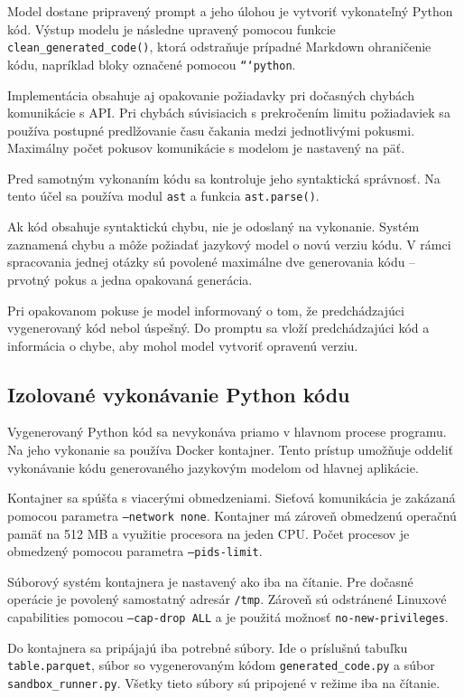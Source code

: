Model dostane pripravený prompt a jeho úlohou je vytvoriť vykonateľný Python
kód. Výstup modelu je následne upravený pomocou funkcie
\texttt{clean\_generated\_code()}, ktorá odstraňuje prípadné Markdown
ohraničenie kódu, napríklad bloky označené pomocou \texttt{```python}.

Implementácia obsahuje aj opakovanie požiadavky pri dočasných chybách
komunikácie s API. Pri chybách súvisiacich s prekročením limitu požiadaviek
sa používa postupné predlžovanie času čakania medzi jednotlivými pokusmi.
Maximálny počet pokusov komunikácie s modelom je nastavený na päť.

Pred samotným vykonaním kódu sa kontroluje jeho syntaktická správnosť.
Na tento účel sa používa modul \texttt{ast} a funkcia
\texttt{ast.parse()}.

Ak kód obsahuje syntaktickú chybu, nie je odoslaný na vykonanie. Systém
zaznamená chybu a môže požiadať jazykový model o novú verziu kódu. V rámci
spracovania jednej otázky sú povolené maximálne dve generovania kódu --
prvotný pokus a jedna opakovaná generácia.

Pri opakovanom pokuse je model informovaný o tom, že predchádzajúci
vygenerovaný kód nebol úspešný. Do promptu sa vloží predchádzajúci kód
a informácia o chybe, aby mohol model vytvoriť opravenú verziu.

\subsection{Izolované vykonávanie Python kódu}

Vygenerovaný Python kód sa nevykonáva priamo v hlavnom procese programu.
Na jeho vykonanie sa používa Docker kontajner. Tento prístup umožňuje oddeliť
vykonávanie kódu generovaného jazykovým modelom od hlavnej aplikácie.

Kontajner sa spúšťa s viacerými obmedzeniami. Sieťová komunikácia je
zakázaná pomocou parametra \texttt{--network none}. Kontajner má zároveň
obmedzenú operačnú pamäť na 512 MB a využitie procesora na jeden CPU.
Počet procesov je obmedzený pomocou parametra \texttt{--pids-limit}.

Súborový systém kontajnera je nastavený ako iba na čítanie. Pre dočasné
operácie je povolený samostatný adresár \texttt{/tmp}. Zároveň sú odstránené
Linuxové capabilities pomocou \texttt{--cap-drop ALL} a je použitá možnosť
\texttt{no-new-privileges}.

Do kontajnera sa pripájajú iba potrebné súbory. Ide o príslušnú tabuľku
\texttt{table.parquet}, súbor so vygenerovaným kódom
\texttt{generated\_code.py} a súbor \texttt{sandbox\_runner.py}. Všetky
tieto súbory sú pripojené v režime iba na čítanie.

